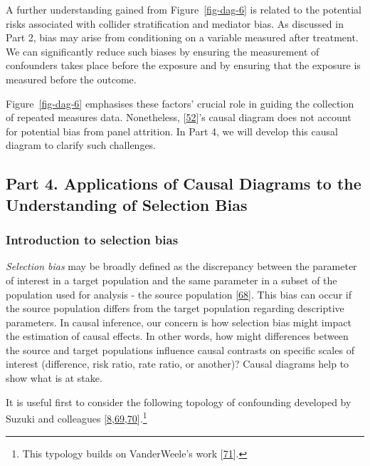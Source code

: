 \documentclass[
  singlecolumn]{article}
\begin{document}
A further understanding gained from Figure~\ref{fig-dag-6} is related to
the potential risks associated with collider stratification and mediator
bias. As discussed in Part 2, bias may arise from conditioning on a
variable measured after treatment. We can significantly reduce such
biases by ensuring the measurement of confounders takes place before the
exposure and by ensuring that the exposure is measured before the
outcome.

Figure~\ref{fig-dag-6} emphasises these factors' crucial role in guiding
the collection of repeated measures data. Nonetheless,
{[}\protect\hyperlink{ref-vanderweele2020}{52}{]}'s causal diagram does
not account for potential bias from panel attrition. In Part 4, we will
develop this causal diagram to clarify such challenges.

\hypertarget{part-4.-applications-of-causal-diagrams-to-the-understanding-of-selection-bias}{%
\subsection{Part 4. Applications of Causal Diagrams to the Understanding
of Selection
Bias}\label{part-4.-applications-of-causal-diagrams-to-the-understanding-of-selection-bias}}

\hypertarget{introduction-to-selection-bias}{%
\subsubsection{Introduction to selection
bias}\label{introduction-to-selection-bias}}

\emph{Selection bias} may be broadly defined as the discrepancy between
the parameter of interest in a target population and the same parameter
in a subset of the population used for analysis - the source population
{[}\protect\hyperlink{ref-hernuxe1n2017}{68}{]}. This bias can occur if
the source population differs from the target population regarding
descriptive parameters. In causal inference, our concern is how
selection bias might impact the estimation of causal effects. In other
words, how might differences between the source and target populations
influence causal contrasts on specific scales of interest (difference,
risk ratio, rate ratio, or another)? Causal diagrams help to show what
is at stake.

It is useful first to consider the following topology of confounding
developed by Suzuki and colleagues
{[}\protect\hyperlink{ref-suzuki2020}{8},\protect\hyperlink{ref-suzuki2016}{69},\protect\hyperlink{ref-suzuki2014}{70}{]}.\footnote{This
  typology builds on VanderWeele's work
  {[}\protect\hyperlink{ref-vanderweele2012}{71}{]}.}
\end{document}
